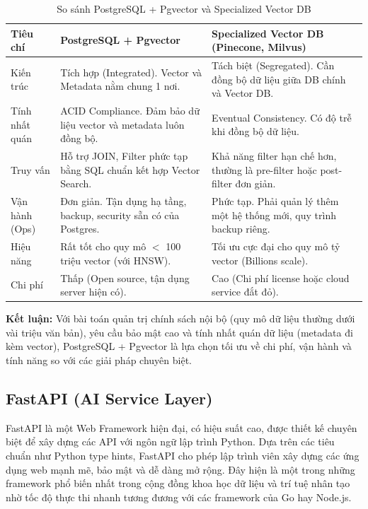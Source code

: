 \documentclass[12pt,a4paper]{report}
\begin{document}
\begin{table}[H]
\centering
\caption{So sánh PostgreSQL + Pgvector và Specialized Vector DB}
\label{tab:pgvector_vs_specialized}
\begin{tabularx}{\textwidth}{|l|X|X|}
\hline
\textbf{Tiêu chí} & \textbf{PostgreSQL + Pgvector} & \textbf{Specialized Vector DB (Pinecone, Milvus)} \\ \hline
Kiến trúc & Tích hợp (Integrated). Vector và Metadata nằm chung 1 nơi. & Tách biệt (Segregated). Cần đồng bộ dữ liệu giữa DB chính và Vector DB. \\ \hline
Tính nhất quán & ACID Compliance. Đảm bảo dữ liệu vector và metadata luôn đồng bộ. & Eventual Consistency. Có độ trễ khi đồng bộ dữ liệu. \\ \hline
Truy vấn & Hỗ trợ JOIN, Filter phức tạp bằng SQL chuẩn kết hợp Vector Search. & Khả năng filter hạn chế hơn, thường là pre-filter hoặc post-filter đơn giản. \\ \hline
Vận hành (Ops) & Đơn giản. Tận dụng hạ tầng, backup, security sẵn có của Postgres. & Phức tạp. Phải quản lý thêm một hệ thống mới, quy trình backup riêng. \\ \hline
Hiệu năng & Rất tốt cho quy mô $<$ 100 triệu vector (với HNSW). & Tối ưu cực đại cho quy mô tỷ vector (Billions scale). \\ \hline
Chi phí & Thấp (Open source, tận dụng server hiện có). & Cao (Chi phí license hoặc cloud service đắt đỏ). \\ \hline
\end{tabularx}
\end{table}

\textbf{Kết luận:} Với bài toán quản trị chính sách nội bộ (quy mô dữ liệu thường dưới vài triệu văn bản), yêu cầu bảo mật cao và tính nhất quán dữ liệu (metadata đi kèm vector), PostgreSQL + Pgvector là lựa chọn tối ưu về chi phí, vận hành và tính năng so với các giải pháp chuyên biệt.

\subsection{FastAPI (AI Service Layer)}
FastAPI là một Web Framework hiện đại, có hiệu suất cao, được thiết kế chuyên biệt để xây dựng các API với ngôn ngữ lập trình Python. Dựa trên các tiêu chuẩn như Python type hints, FastAPI cho phép lập trình viên xây dựng các ứng dụng web mạnh mẽ, bảo mật và dễ dàng mở rộng. Đây hiện là một trong những framework phổ biến nhất trong cộng đồng khoa học dữ liệu và trí tuệ nhân tạo nhờ tốc độ thực thi nhanh tương đương với các framework của Go hay Node.js.
\end{document}

